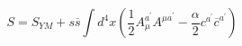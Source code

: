 \begin{equation}
S=S_{YM}+s\overline{s}\int d^{4}x\left( \frac{1}{2}A_{\mu }^{a^{\prime
}}A^{\mu a^{\prime }}-\frac{\alpha }{2}c^{a^{\prime }}\overline{c}%
^{a^{\prime }}\right)   \label{dudal30}
\end{equation}

